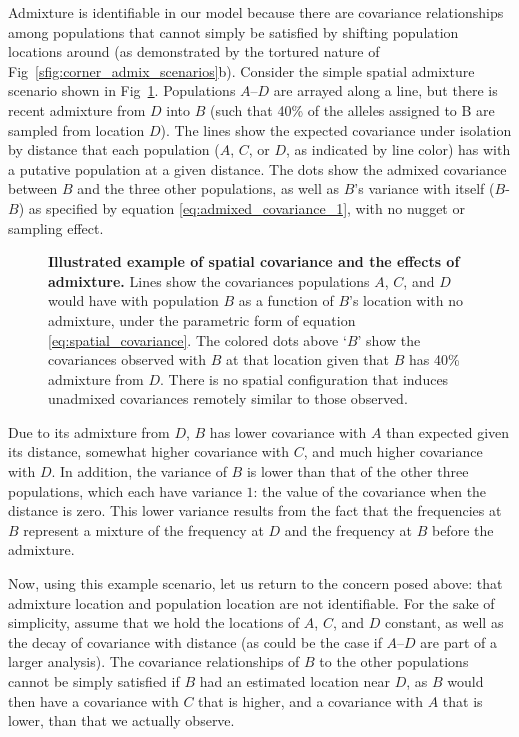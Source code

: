 \documentclass[10pt,letterpaper]{article}
\begin{document}
Admixture is identifiable in our model because there are covariance relationships among populations that cannot simply be satisfied by shifting population locations around (as demonstrated by the tortured nature of Fig\ \ref{sfig:corner_admix_scenarios}b). 
Consider the simple spatial admixture scenario shown in Fig\ \ref{sfig:toy_admixture}. 
Populations $A$--$D$ are arrayed  along a line, but there is recent admixture from $D$ into $B$ (such that 40\% of the alleles assigned to B are sampled from location $D$).  
The lines show the expected covariance under isolation by distance that each population ($A$, $C$, or $D$, as indicated by line color) has with a putative population at a given distance.  The dots show the admixed covariance between $B$ and the three other populations, as well as $B$'s variance with itself ($B$-$B$) as specified by equation \eqref{eq:admixed_covariance_1}, with no nugget or sampling effect.
%
\begin{figure}[ht!]
\begin{center}
\end{center}
\caption{
\textbf{Illustrated example of spatial covariance and the effects of admixture.}
Lines show the covariances populations $A$, $C$, and $D$ 
would have with population $B$ as a function of $B$'s location with no admixture,
under the parametric form of equation \eqref{eq:spatial_covariance}.
The colored dots above `$B$' show the covariances observed with 
$B$ at that location given that $B$ has 40\% admixture from $D$.
There is no spatial configuration that induces unadmixed covariances 
remotely similar to those observed.
} \label{sfig:toy_admixture}
\end{figure}

Due to its admixture from $D$, $B$ has lower covariance with $A$ than expected given its distance, somewhat higher covariance with $C$, and much higher covariance with $D$. In addition, the variance of $B$ is lower than that of the other three populations, which each have variance $1$: the value of the covariance when the distance is zero. This lower variance results from the fact that the frequencies at $B$ represent a mixture of the frequency at $D$ and the frequency at $B$ before the admixture. 

Now, using this example scenario, let us return to the concern posed above: that admixture location and population location are not identifiable.  For the sake of simplicity, assume that we hold the locations of $A$, $C$, and $D$ constant, as well as the decay of covariance with distance (as could be the case if $A$--$D$ are part of a larger analysis).  The covariance relationships of $B$ to the other populations cannot be simply satisfied if $B$ had an estimated location near $D$, as $B$ would then have a covariance with $C$ that is higher, and a covariance with $A$ that is lower, than that we actually observe. 
\end{document}
